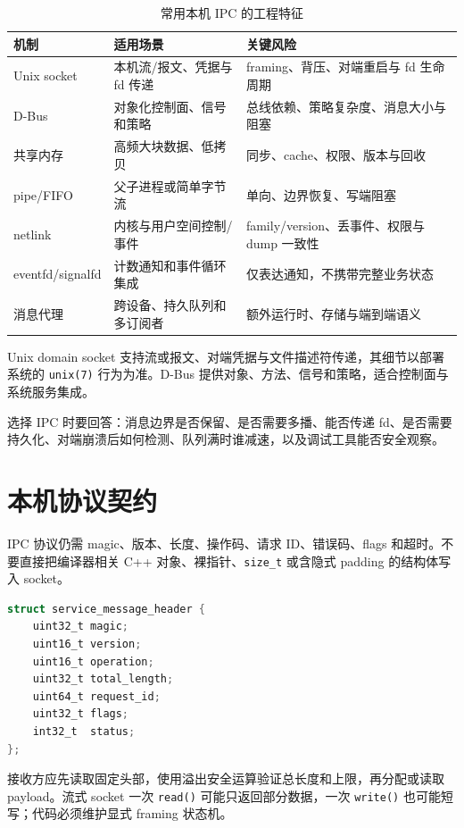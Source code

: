 \begin{table}[H]
  \centering
  \caption{常用本机 IPC 的工程特征}
  \begin{tabular}{p{29mm}p{48mm}p{58mm}}
    \hline
    机制 & 适用场景 & 关键风险 \\
    \hline
    Unix socket & 本机流/报文、凭据与 fd 传递 & framing、背压、对端重启与 fd 生命周期 \\
    D-Bus & 对象化控制面、信号和策略 & 总线依赖、策略复杂度、消息大小与阻塞 \\
    共享内存 & 高频大块数据、低拷贝 & 同步、cache、权限、版本与回收 \\
    pipe/FIFO & 父子进程或简单字节流 & 单向、边界恢复、写端阻塞 \\
    netlink & 内核与用户空间控制/事件 & family/version、丢事件、权限与 dump 一致性 \\
    eventfd/signalfd & 计数通知和事件循环集成 & 仅表达通知，不携带完整业务状态 \\
    消息代理 & 跨设备、持久队列和多订阅者 & 额外运行时、存储与端到端语义 \\
    \hline
  \end{tabular}
\end{table}

Unix domain socket 支持流或报文、对端凭据与文件描述符传递，其细节以部署系统的 \texttt{unix(7)} 行为为准\cite{linux-unix-man}。D-Bus 提供对象、方法、信号和策略，适合控制面与系统服务集成\cite{dbus-spec}。

选择 IPC 时要回答：消息边界是否保留、是否需要多播、能否传递 fd、是否需要持久化、对端崩溃后如何检测、队列满时谁减速，以及调试工具能否安全观察。

\section{本机协议契约}

IPC 协议仍需 magic、版本、长度、操作码、请求 ID、错误码、flags 和超时。不要直接把编译器相关 C++ 对象、裸指针、\texttt{size\_t} 或含隐式 padding 的结构体写入 socket。

\begin{lstlisting}[language=C,caption={本机服务协议头}]
struct service_message_header {
    uint32_t magic;
    uint16_t version;
    uint16_t operation;
    uint32_t total_length;
    uint64_t request_id;
    uint32_t flags;
    int32_t  status;
};
\end{lstlisting}

接收方应先读取固定头部，使用溢出安全运算验证总长度和上限，再分配或读取 payload。流式 socket 一次 \texttt{read()} 可能只返回部分数据，一次 \texttt{write()} 也可能短写；代码必须维护显式 framing 状态机。

